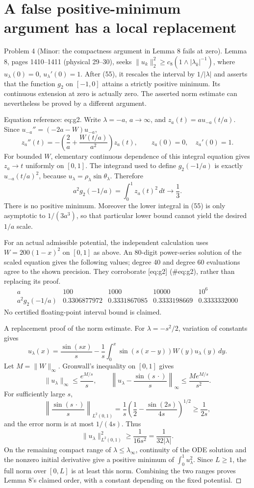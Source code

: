 \documentclass[10pt]{article}
\begin{document}
\section*{A false positive-minimum argument has a local replacement}
Problem 4 (Minor: the compactness argument in Lemma 8 fails at zero).  Lemma 8, pages 1410–1411 (physical 29–30), seeks \(\|u_k\|_2^2\geq c_8(1\wedge|\lambda_k|^{-1})\), where \(u_\lambda(0)=0\), \(u_\lambda'(0)=1\). After (55), it rescales the interval by \(1/|\lambda|\) and asserts that the function \(g_2\) on \([-1,0]\) attains a strictly positive minimum. Its continuous extension at zero is actually zero. The asserted norm estimate can nevertheless be proved by a different argument.\par
Equation reference: eq:g2. Write \(\lambda=-a\), \(a\to\infty\), and \(z_a(t)=a u_{-a}(t/a)\). Since \(u_{-a}''=(-2a-W)u_{-a}\), \[z_a''(t)=-
 \left(\frac2a+\frac{W(t/a)}{a^2}\right)z_a(t),\qquad
 z_a(0)=0,\quad z_a'(0)=1.\] For bounded \(W\), elementary continuous dependence of this integral equation gives \(z_a\to t\) uniformly on \([0,1]\). The integrand used to define \(g_2(-1/a)\) is exactly \(u_{-a}(t/a)^2\), because \(u_\lambda=\rho_\lambda\sin\theta_\lambda\). Therefore \[
 a^2g_2(-1/a)=\int_0^1z_a(t)^2\,dt\longrightarrow\frac13.\] There is no positive minimum. Moreover the lower integral in (55) is only asymptotic to \(1/(3a^3)\), so that particular lower bound cannot yield the desired \(1/a\) scale.\par
For an actual admissible potential, the independent calculation uses \(W=200(1-x)^2\) on \([0,1]\) as above. An 80-digit power-series solution of the scaled equation gives the following values; degree 40 and degree 60 evaluations agree to the shown precision. They corroborate [eq:g2] (\#eq:g2), rather than replacing its proof. \[\begin{array}{c|cccc}
 a&100&1000&10000&10^6\\ \hline
 a^2g_2(-1/a)&0.3306877972&0.3331867085&
              0.3333198669&0.3333332000
\end{array}\] No certified floating-point interval bound is claimed.\par
A replacement proof of the norm estimate. For \(\lambda=-s^2/2\), variation of constants gives \[u_\lambda(x)=\frac{\sin(sx)}s
   -\frac1s\int_0^x\sin(s(x-y))W(y)u_\lambda(y)\,dy .\] Let \(M=\|W\|_\infty\). Gronwall’s inequality on \([0,1]\) gives \[\|u_\lambda\|_\infty\leq \frac{e^{M/s}}s,\qquad
 \left\|u_\lambda-\frac{\sin(s\,\cdot)}s\right\|_\infty
       \leq\frac{Me^{M/s}}{s^2}.\] For sufficiently large \(s\), \[\left\|\frac{\sin(s\,\cdot)}s\right\|_{L^2(0,1)}
 =\frac1s\left(\frac12-\frac{\sin(2s)}{4s}\right)^{1/2}
 \geq\frac1{2s},\] and the error norm is at most \(1/(4s)\). Thus \[\|u_\lambda\|_{L^2(0,1)}^2
    \geq\frac1{16s^2}=\frac1{32|\lambda|}.\] On the remaining compact range of \(\lambda\leq\lambda_\infty\), continuity of the ODE solution and the nonzero initial derivative give a positive minimum of \(\int_0^1u_\lambda^2\). Since \(L\geq1\), the full norm over \([0,L]\) is at least this norm. Combining the two ranges proves Lemma 8’s claimed order, with a constant depending on the fixed potential. ◻\par
\end{document}
